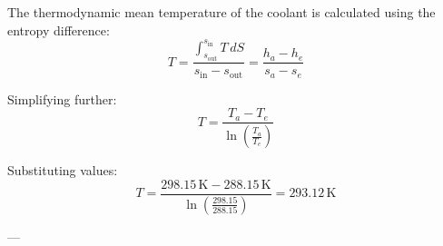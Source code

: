 The thermodynamic mean temperature of the coolant is calculated using the entropy difference:  
\[
T = \frac{\int_{s_{\text{out}}}^{s_{\text{in}}} T \, dS}{s_{\text{in}} - s_{\text{out}}} = \frac{h_a - h_e}{s_a - s_e}
\]  

Simplifying further:  
\[
T = \frac{T_a - T_e}{\ln \left( \frac{T_a}{T_e} \right)}
\]  

Substituting values:  
\[
T = \frac{298.15 \, \text{K} - 288.15 \, \text{K}}{\ln \left( \frac{298.15}{288.15} \right)} = 293.12 \, \text{K}
\]  

---